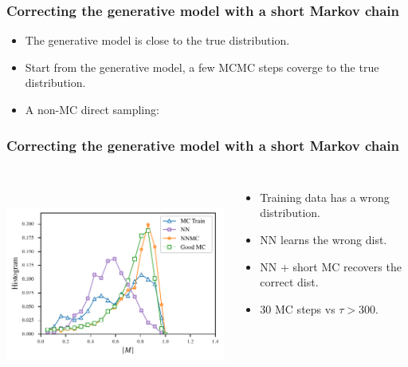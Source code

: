 \documentclass[xcolor=table, 10pt, aspectratio=169, ignorenonframetext]{beamer}
\begin{document}
\begin{frame}
  \frametitle{Correcting the generative model with a short Markov chain}
	\begin{itemize}
		\item The generative model is close to the true distribution.
		\item Start from the generative model, a few MCMC steps coverge to the true distribution.
		\item A non-MC direct sampling:
		\begin{center}
		\end{center}
	\end{itemize}
\end{frame}

\begin{frame}
  \frametitle{Correcting the generative model with a short Markov chain}
	\begin{columns}
		\begin{center}
			\includegraphics[height=7cm]{hist-ising}
		\end{center}
		\begin{itemize}
			\item Training data has a wrong distribution.
			\item NN learns the wrong dist.
			\item NN + short MC recovers the correct dist.
                        \item 30 MC steps vs $\tau>300$.
		\end{itemize}
	\end{columns}
\end{frame}
\end{document}
